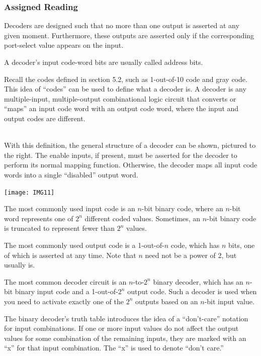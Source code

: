 \documentclass[10pt,a4paper]{article}
\begin{document}
\subsubsection{Assigned Reading}
\begin{itemize}
\item Decoders are designed such that no more than one output is asserted at any given moment. Furthermore, these outputs are asserted only if the corresponding port-select value appears on the input. 
\item A decoder's input code-word bits are usually called address bits. 
\item Recall the codes defined in section 5.2, such as 1-out-of-10 code and gray code. This idea of ``codes'' can be used to define what a decoder is. A decoder is any multiple-input, multiple-output combinational logic circuit that converts or ``maps'' an input code word with an output code word, where the input and output codes are different.\\~\\
\begin{minipage}{.45\textwidth}
\item With this definition, the general structure of a decoder can be shown, pictured to the right. The enable inputs, if present, must be asserted for the decoder to perform its normal mapping function. Otherwise, the decoder maps all input code words into a single ``disabled'' output word.
\end{minipage}
\begin{minipage}{.45\textwidth}
\texttt{[image: IMG11]}
\end{minipage}
\item The most commonly used input code is an $n$-bit binary code, where an $n$-bit word represents one of $2^n$ different coded values. Sometimes, an $n$-bit binary code is truncated to represent fewer than $2^n$ values. 
\item The most commonly used output code is a 1-out-of-$n$ code, which has $n$ bits, one of which is asserted at any time. Note that $n$ need not be a power of 2, but usually is. 
\item The most common decoder circuit is an $n$-to-$2^n$ binary decoder, which has an $n$-bit binary input code and a 1-out-of-$2^n$ output code. Such a decoder is used when you need to activate exactly one of the $2^n$ outputs based on an $n$-bit input value.
\item The binary decoder's truth table introduces the idea of a ``don't-care'' notation for input combinations. If one or more input values do not affect the output values for some combination of the remaining inputs, they are marked with an ``x'' for that input combination. The ``x'' is used to denote ``don't care.''

\end{itemize}
\end{document}
